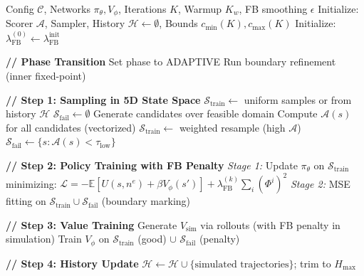 \begin{algorithm}[H]
\caption{Deep Ramsey Algorithm for Heterogeneous Agents}
\label{alg:het_agent_v2}
\begin{algorithmic}[1]
\Require Config $\mathcal{C}$, Networks $\pi_\theta, V_\phi$, Iterations $K$, Warmup $K_w$, FB smoothing $\epsilon$
\State Initialize: Scorer $\mathcal{A}$, Sampler, History $\mathcal{H} \gets \emptyset$, Bounds $c_{\min}(K), c_{\max}(K)$
\State Initialize: $\lambda_{\text{FB}}^{(0)} \gets \lambda_{\text{FB}}^{\text{init}}$ 

 
    
    \State \textbf{// Phase Transition}
        \State Set phase to ADAPTIVE
        \State Run boundary refinement (inner fixed-point)
    \EndIf
    
    \State
    \State \textbf{// Step 1: Sampling in 5D State Space}
        \State $\mathcal{S}_{\text{train}} \gets$ uniform samples or from history $\mathcal{H}$
        \State $\mathcal{S}_{\text{fail}} \gets \emptyset$
    \Else
        \State Generate candidates over feasible domain
        \State Compute $\mathcal{A}(s)$ for all candidates (vectorized)
        \State $\mathcal{S}_{\text{train}} \gets$ weighted resample (high $\mathcal{A}$)
        \State $\mathcal{S}_{\text{fail}} \gets \{s : \mathcal{A}(s) < \tau_{\text{low}}\}$
    \EndIf
    
    \State
    \State \textbf{// Step 2: Policy Training with FB Penalty}
    \State \textit{Stage 1:} Update $\pi_\theta$ on $\mathcal{S}_{\text{train}}$ minimizing:
    \State \hspace{2em} $\mathcal{L} = -\mathbb{E}[U(s, n^e) + \beta V_\phi(s')] + \lambda_{\text{FB}}^{(k)} \sum_i (\Phi^i)^2$
        \State \textit{Stage 2:} MSE fitting on $\mathcal{S}_{\text{train}} \cup \mathcal{S}_{\text{fail}}$ (boundary marking)
    \EndIf
    
    \State
    \State \textbf{// Step 3: Value Training}
    \State Generate $V_{\text{sim}}$ via rollouts (with FB penalty in simulation)
    \State Train $V_\phi$ on $\mathcal{S}_{\text{train}}$ (good) $\cup$ $\mathcal{S}_{\text{fail}}$ (penalty)
    
    \State
    \State \textbf{// Step 4: History Update}
    \State $\mathcal{H} \gets \mathcal{H} \cup \{\text{simulated trajectories}\}$; trim to $H_{\max}$
    

\end{algorithmic}
\end{algorithm}
